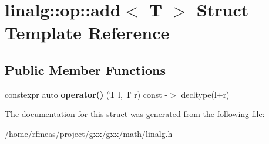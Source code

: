 \hypertarget{structlinalg_1_1op_1_1add}{}\section{linalg\+:\+:op\+:\+:add$<$ T $>$ Struct Template Reference}
\label{structlinalg_1_1op_1_1add}
\subsection*{Public Member Functions}
\begin{DoxyCompactItemize}
\item 
constexpr auto {\bfseries operator()} (T l, T r) const -\/$>$ decltype(l+r)\hypertarget{structlinalg_1_1op_1_1add_ace1a21c874186982a705373e8c8dca85}{}\label{structlinalg_1_1op_1_1add_ace1a21c874186982a705373e8c8dca85}

\end{DoxyCompactItemize}


The documentation for this struct was generated from the following file\+:\begin{DoxyCompactItemize}
\item 
/home/rfmeas/project/gxx/gxx/math/linalg.\+h\end{DoxyCompactItemize}
